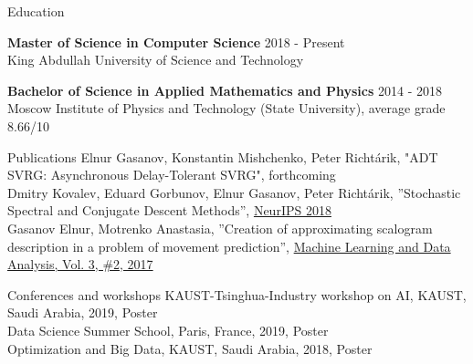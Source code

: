 \documentclass{resume} %
\begin{document}

\begin{rSection}{Education}

{\bf Master of Science in Computer Science} \hfill {2018 - Present }
\\ 
King Abdullah University of Science and Technology

{\textbf{Bachelor of Science in Applied Mathematics and Physics}}  \hfill {2014 - 2018}\\
Moscow Institute of Physics and Technology (State University), average grade 8.66/10

\end{rSection}



\begin{rSection}{Publications}
{Elnur Gasanov, Konstantin Mishchenko, Peter Richt{\'a}rik, "ADT SVRG: Asynchronous Delay-Tolerant SVRG", forthcoming}\\
{Dmitry Kovalev, Eduard Gorbunov, Elnur Gasanov, Peter Richt{\'a}rik, ”Stochastic Spectral and Conjugate Descent Methods”, \href{https://papers.nips.cc/paper/7596-stochastic-spectral-and-conjugate-descent-methods}{NeurIPS 2018}}\\
{Gasanov Elnur, Motrenko Anastasia, ”Creation of approximating scalogram description in a problem of movement prediction”, \href{http://jmlda.org/papers/doc/2017/no2/Gasanov2017ECoGAnalysis.pdf}{Machine Learning and Data Analysis, Vol. 3, \#2, 2017}}
	
\end{rSection}


\begin{rSection}{Conferences and workshops}
{KAUST-Tsinghua-Industry workshop on AI, KAUST, Saudi Arabia, 2019, Poster}\\
{Data Science Summer School, Paris, France, 2019, Poster}\\
{Optimization and Big Data, KAUST, Saudi Arabia, 2018, Poster}\\
\end{rSection}
\end{document}
